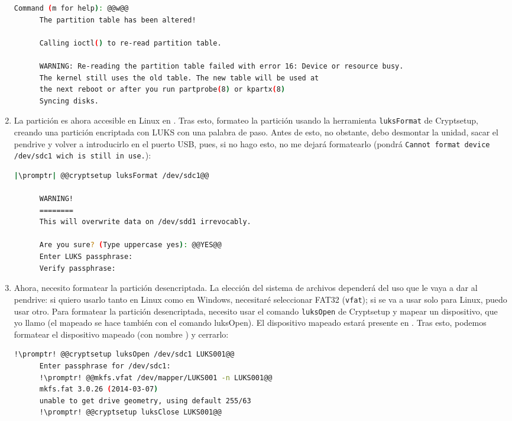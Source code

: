 \begin{enumerate}
\begin{lstlisting}[gobble=6,language=bash,style=bashinteract,escapechar=|]
      Command (m for help): @@w@@
      The partition table has been altered!

      Calling ioctl() to re-read partition table.

      WARNING: Re-reading the partition table failed with error 16: Device or resource busy.
      The kernel still uses the old table. The new table will be used at
      the next reboot or after you run partprobe(8) or kpartx(8)
      Syncing disks.
    \end{lstlisting}

  \item La partición es ahora accesible en Linux en . Tras esto, formateo la partición usando la
    herramienta \lstinline!luksFormat! de Cryptsetup, creando una partición encriptada con LUKS con una palabra
    de paso. Antes de esto, no obstante, debo desmontar la unidad, sacar el pendrive y volver a introducirlo en
    el puerto USB, pues, si no hago esto, no me dejará formatearlo (pondrá
    \lstinline+Cannot format device /dev/sdc1 wich is still in use.+):

    \begin{lstlisting}[gobble=6,language=bash,style=bashinteract,escapechar=|]
      |\promptr| @@cryptsetup luksFormat /dev/sdc1@@

      WARNING!
      ========
      This will overwrite data on /dev/sdd1 irrevocably.

      Are you sure? (Type uppercase yes): @@YES@@
      Enter LUKS passphrase:
      Verify passphrase:
    \end{lstlisting}

  \item Ahora, necesito formatear la partición desencriptada. La elección del sistema de archivos dependerá del
    uso que le vaya a dar al pendrive: si quiero usarlo tanto en Linux como en Windows, necesitaré seleccionar
    FAT32 (\lstinline!vfat!); si se va a usar solo para Linux, puedo usar otro. Para formatear la partición
    desencriptada, necesito usar el comando \lstinline!luksOpen! de Cryptsetup y mapear un dispositivo, que yo
    llamo  (el mapeado se hace también con el comando luksOpen). El dispositivo mapeado estará
    presente en . Tras esto, podemos formatear el dispositivo mapeado (con nombre
    ) y cerrarlo:

    \begin{lstlisting}[gobble=6,language=bash,style=bashinteract,escapechar=!]
      !\promptr! @@cryptsetup luksOpen /dev/sdc1 LUKS001@@
      Enter passphrase for /dev/sdc1:
      !\promptr! @@mkfs.vfat /dev/mapper/LUKS001 -n LUKS001@@
      mkfs.fat 3.0.26 (2014-03-07)
      unable to get drive geometry, using default 255/63
      !\promptr! @@cryptsetup luksClose LUKS001@@
    \end{lstlisting}


\end{enumerate}

